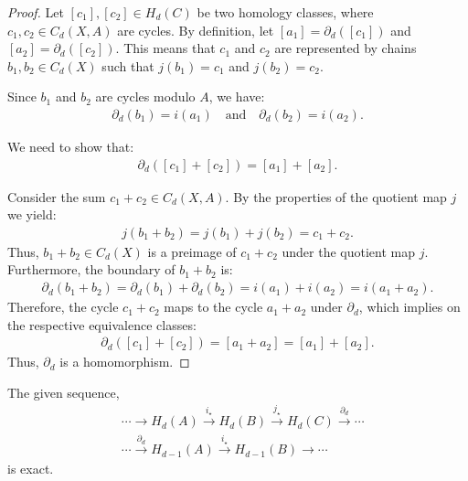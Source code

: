 \begin{proof}
Let \([c_{1}], [c_{2}] \in H_{d}(C)\) be two homology classes, where \(c_{1}, c_{2} \in C_{d}(X, A)\) are cycles. By definition, let \([a_{1}] = \partial_{d}([c_{1}])\) and \([a_{2}] = \partial_{d}([c_{2}])\). This means that \(c_{1}\) and \(c_{2}\) are represented by chains \(b_{1}, b_{2} \in C_{d}(X)\) such that \(j(b_{1}) = c_{1}\) and \(j(b_{2}) = c_{2}\).

Since \(b_{1}\) and \(b_{2}\) are cycles modulo \(A\), we have:
\begin{align}
\partial_{d}(b_{1}) = i(a_{1}) \quad \text{and} \quad \partial_{d}(b_{2}) = i(a_{2}).
\end{align}

We need to show that:
\begin{align}
\partial_{d}([c_{1}] + [c_{2}]) = [a_{1}] + [a_{2}].
\end{align}

Consider the sum \(c_{1} + c_{2} \in C_{d}(X, A)\). By the properties of the quotient map \(j\) we yield:
\begin{align}
j(b_{1} + b_{2}) = j(b_{1}) + j(b_{2}) = c_{1} + c_{2}.
\end{align}
Thus, \(b_{1} + b_{2} \in C_{d}(X)\) is a preimage of \(c_{1} + c_{2}\) under the quotient map \(j\). Furthermore, the boundary of \(b_{1} + b_{2}\) is:
\begin{align}
\partial_{d}(b_{1} + b_{2}) = \partial_{d}(b_{1}) + \partial_{d}(b_{2}) = i(a_{1}) + i(a_{2}) = i(a_{1} + a_{2}).
\end{align}
Therefore, the cycle \(c_{1} + c_{2}\) maps to the cycle \(a_{1} + a_{2}\) under \(\partial_{d}\), which implies on the respective equivalence classes:
\begin{align}
\partial_{d}([c_{1}] + [c_{2}]) = [a_{1} + a_{2}] = [a_{1}] + [a_{2}].
\end{align}
Thus, \(\partial_{d}\) is a homomorphism.
\end{proof}

\begin{lemma}{\cite[p.115ff]{hatcher2005algebraic}}
\label{exacthomsequence}
The given sequence,
\begin{align}
&\cdots \rightarrow H_{d}(A) \xrightarrow{i_\star} H_{d}(B) \xrightarrow{j_\star} H_{d}(C) \xrightarrow{\partial_d} \cdots \\
&\cdots \xrightarrow{\partial_d} H_{d-1}(A) \xrightarrow{i_\star} H_{d-1}(B) \rightarrow \cdots
\end{align}
is exact.
\end{lemma}

